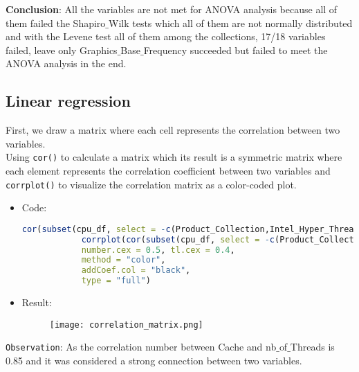 \documentclass{article}
\begin{document}
	\textbf{Conclusion}: All the variables are not met for ANOVA analysis because all of them failed the Shapiro$\_$Wilk tests which all of them are not normally distributed and with the Levene test all of them among the collections, 17/18 variables failed, leave only Graphics$\_$Base$\_$Frequency succeeded but failed to meet the ANOVA analysis in the end. 
	
	\subsection{Linear regression}
	First, we draw a matrix where each cell represents the correlation between two variables.\\
	Using \texttt{cor()} to calculate a matrix which its result is a symmetric matrix where each element represents the correlation coefficient between two variables and \texttt{corrplot()} to visualize the correlation matrix as a color-coded plot.
	\begin{itemize}
		\item Code:
		\begin{lstlisting}[language=R]
			cor(subset(cpu_df, select = -c(Product_Collection,Intel_Hyper_Threading_Technology_)))
			corrplot(cor(subset(cpu_df, select = -c(Product_Collection,Intel_Hyper_Threading_Technology_))) ,
			number.cex = 0.5, tl.cex = 0.4,
			method = "color",
			addCoef.col = "black",
			type = "full")
		\end{lstlisting}
		\item Result:
		\begin{figure}[h]
			\centering
			\texttt{[image: correlation\_matrix.png]} %
			\label{fig:enter-label}
		\end{figure}
		
	\end{itemize}
	\texttt{Observation}: As the correlation number between Cache and nb$\_$of$\_$Threads is 0.85 and it was considered a strong connection between two variables.
	
\end{document}
